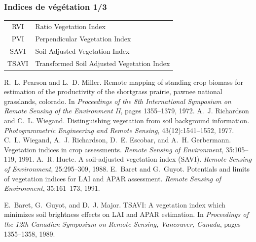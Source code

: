 \documentclass[compress]{beamer}
\begin{document}
\begin{frame}
\frametitle{Indices de végétation 1/3}
\footnotesize  \centering
\begin{tabular}{|c|l|}
\hline
RVI &  Ratio Vegetation Index \cite{Pearson1972-RVI}\\
PVI & Perpendicular Vegetation Index \cite{Richardson1977-PVI,Wiegand1991-PVI}\\ 
SAVI & Soil Adjusted Vegetation Index \cite{Huete1988-SAVI} \\
TSAVI & Transformed Soil Adjusted Vegetation Index \cite{Baret1989-TSAVI,Baret1991-TSAVI} \\
\hline
\end{tabular}
\begin{thebibliography}{noidea}
\tiny
{}
R.~L. Pearson and L.~D. Miller. Remote mapping of standing crop biomass for estimation of the
  productivity of the shortgrass prairie, pawnee national grasslands,
        colorado.  In {\em Proceedings of the 8th International Symposium on Remote
  Sensing of the Environment II}, pages 1355--1379, 1972.
A.~J. Richardson and C.~L. Wiegand.
 Distinguishing vegetation from soil background information.
 {\em Photogrammetric Engineering and Remote Sensing},
  43(12):1541--1552, 1977.
C.~L. Wiegand, A.~J. Richardson, D.~E. Escobar, and A.~H. Gerbermann.
 Vegetation indices in crop assessments.
 {\em Remote Sensing of Environment}, 35:105--119, 1991.
A.~R. Huete.
 A soil-adjusted vegetation index ({SAVI}).
 {\em Remote Sensing of Environment}, 25:295--309, 1988.
E.~Baret and G.~Guyot.
 Potentials and limits of vegetation indices for {LAI} and {APAR}
  assessment.
 {\em Remote Sensing of Environment}, 35:161--173, 1991.

E.~Baret, G.~Guyot, and D.~J. Major.
 {TSAVI}: A vegetation index which minimizes soil brightness effects
  on {LAI} and {APAR} estimation.
 In {\em Proceedings of the 12th Canadian Symposium on Remote Sensing,
  Vancouver, Canada}, pages 1355--1358, 1989.
\end{thebibliography}
\end{frame}
\end{document}
